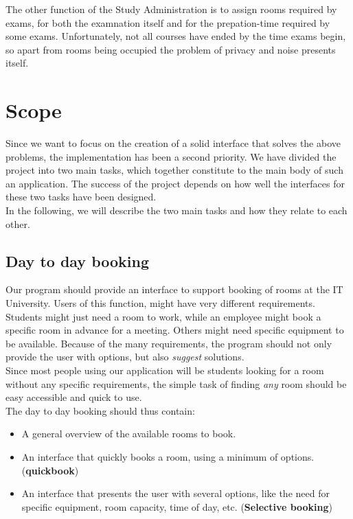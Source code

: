 The other function of the Study Administration is to assign rooms required by exams, for both the examnation itself and for the prepation-time required by some exams. Unfortunately, not all courses have ended by the time exams begin, so apart from rooms being occupied the problem of privacy and noise presents itself.\\

\label{sec:scope}
\section{Scope}
 Since we want to focus on the creation of a solid interface that solves the above problems, the implementation has been a second priority. We have divided the project into two main tasks, which together constitute to the main body of such an application. The success of the project depends on how well the interfaces for these two tasks have been designed.\\
In the following, we will describe the two main tasks and how they relate to each other.

\subsection{Day to day booking}
Our program should provide an interface to support booking of rooms at the IT University. Users of this function, might have very different requirements. Students might just need a room to work, while an employee might book a specific room in advance for a meeting. Others might need specific equipment to be available. Because of the many requirements, the program should not only provide the user with options, but also \emph{suggest} solutions.\\
Since most people using our application will be students looking for a room without any specific requirements, the simple task of finding \emph{any} room should be easy accessible and quick to use. \\

The day to day booking should thus contain:

\begin{itemize}
	\item A general overview of the available rooms to book.
	\item An interface that quickly books a room, using a minimum of options. (\textbf{quickbook})
	\item An interface that presents the user with several options, like the need for specific equipment, room capacity, time of day, etc. (\textbf{Selective booking})
\end{itemize}

